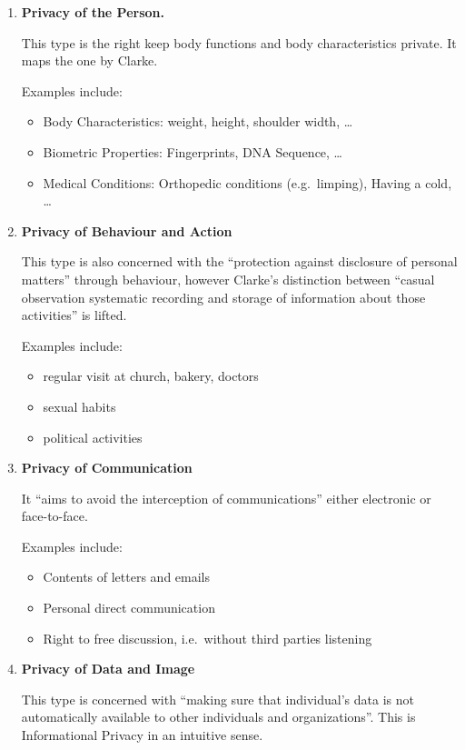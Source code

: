\begin{enumerate}

\item \textbf{Privacy of the Person.}

This type is the right keep body functions and body characteristics private. It maps the one by Clarke.

Examples include:
\begin{itemize}
\item Body Characteristics: weight, height, shoulder width, \ldots
\item Biometric Properties: Fingerprints, DNA Sequence, \ldots
\item Medical Conditions: Orthopedic conditions (e.g.~limping), Having a cold, \ldots
\end{itemize}

\item \textbf{Privacy of Behaviour and Action}

This type is also concerned with the ``protection against disclosure of personal matters'' through behaviour, however Clarke's distinction between ``casual observation \om systematic recording and storage of information about those activities'' is lifted.

Examples include:
\begin{itemize}
\item regular visit at church, bakery, doctors
\item sexual habits
\item political activities
\end{itemize}

\item \textbf{Privacy of Communication}

It ``aims to avoid the interception of communications'' either electronic or face-to-face.

Examples include:
\begin{itemize}
\item Contents of letters and emails
\item Personal direct communication
\item Right to free discussion, i.e.~without third parties listening
\end{itemize}

\item \textbf{Privacy of Data and Image}

This type is concerned with ``making sure that individual's data is not automatically available to other individuals and organizations''. This is Informational Privacy in an intuitive sense.


\end{enumerate}
